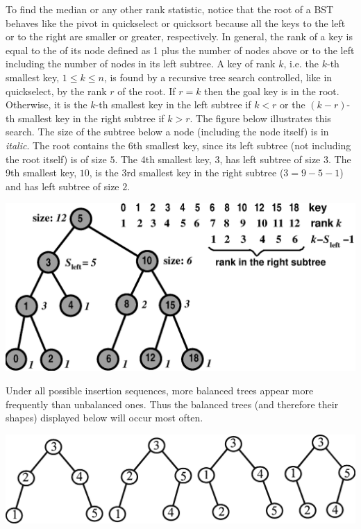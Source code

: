 To find the median or any other rank statistic, notice that 
the root of a BST behaves like the pivot in quickselect or quicksort because 
all the keys to the left or to the right are smaller or greater,
respectively. In general, the rank of a key is equal to
the  of its node defined as 1 plus the number of nodes above or 
to the left including the number of nodes in its left subtree.
A key of rank $k$, i.e. the
$k$-th smallest key, $1\leq k\leq n$, is found by a recursive 
tree search controlled, like in quickselect, by the rank $r$ of the root.  If $r=k$ then
the goal key is in the root. Otherwise, it is the $k$-th smallest key 
in the left subtree if $k < r$  or the $(k - r)$-th smallest key in the right subtree if $k > r$.
The figure below illustrates this search. The size of the subtree
below a node (including the node itself) is in \emph{italic}. The root
contains the 6th smallest key, since its left subtree (not including the
root itself) is of size $5$. The 4th smallest key, $3$, has left subtree
of size $3$.  The 9th smallest key, $10$, is the $3$rd smallest key in
the right subtree ($3=9-5-1$) and has left subtree of size $2$.
\begin{center}
\includegraphics[width=0.6\linewidth]{figs/btr-rank}
\end{center}


Under all possible insertion sequences, 
more balanced trees appear more frequently than unbalanced ones. Thus
the balanced trees (and therefore their shapes) displayed below  will 
occur most often.

\begin{center}
\includegraphics[width=0.65\linewidth]{figs/sol-bst-dist}
\end{center}

